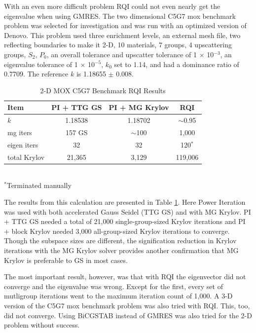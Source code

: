 With an even more difficult problem RQI could not even nearly get the eigenvalue when using GMRES. The two dimensional C5G7 mox benchmark problem \cite{OECD-NEA2003} was selected for investigation and was run with an optimized version of Denovo. This problem used three enrichment levels, an external mesh file, two reflecting boundaries to make it 2-D, 10 materials, 7 groups, 4 upscattering groups, $S_{2}$, $P_{0}$, an overall tolerance and upscatter tolerance of 1 $\times$ 10$^{-3}$, an eigenvalue tolerance of 1 $\times$ 10$^{-5}$, $k_{0}$ set to 1.14, and had a dominance ratio of 0.7709. The reference $k$ is 1.18655 $\pm$ 0.008.

\begin{table}[!h]
\caption{2-D MOX C5G7 Benchmark RQI Results}
\begin{center}
\begin{tabular}{l c c c}
\hline
Item & PI + TTG GS & PI +  MG Krylov & RQI \\[0.5ex]
\hline
$k$ & 1.18538 & 1.18702 & $\sim$0.95 \\
mg iters & 157 GS & $\sim$100 & 1,000 \\
eigen iters & 32 & 32 & 120$^{*}$ \\
total Krylov & 21,365 & 3,129 & 119,006 \\
\hline 
\end{tabular} \\
$^{*}$Terminated manually
\end{center}
\label{table:2DMoxRQI}
\end{table}
%
The results from this calculation are presented in Table \ref{table:2DMoxRQI}. Here Power Iteration was used with both accelerated Gauss Seidel (TTG GS) and with MG Krylov. PI + TTG GS needed a total of 21,000 single-group-sized Krylov iterations and PI + block Krylov needed 3,000 all-group-sized Krylov iterations to converge. Though the subspace sizes are different, the signification reduction in Krylov iterations with the MG Krylov solver provides another confirmation that MG Krylov is preferable to GS in most cases. 

The most important result, however, was that with RQI the eigenvector did not converge and the eigenvalue was wrong. Except for the first, every set of mutligroup iterations went to the maximum iteration count of 1,000. A 3-D version of the C5G7 mox benchmark problem \cite{OECD-NEA2005} was also tried with RQI. This, too, did not converge. Using BiCGSTAB instead of GMRES was also tried for the 2-D problem without success. 

